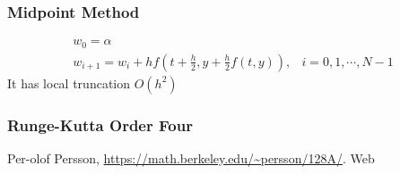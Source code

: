 \documentclass[12pt]{article}
\begin{document}
\subsubsection{Midpoint Method}
\begin{eqnarray*}
	w_0 = \alpha \\
	w_{i+1} = w_i + hf\left(t + \frac{h}{2}, y + \frac{h}{2}f(t,y)\right), & i= 0,1,\cdots, N-1
\end{eqnarray*}
It has local truncation $O(h^2)$
\subsubsection{Runge-Kutta Order Four}



 \newpage
 \begin{thebibliography}{1}

      Per-olof Persson, \url{https://math.berkeley.edu/~persson/128A/}. Web

  \end{thebibliography}
\end{document}
